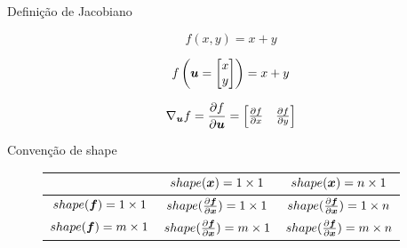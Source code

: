 \documentclass[10pt]{beamer}
\begin{document}
\nocite{DeepLearningbook}
\nocite{VectorCalculus}
\nocite{graphsbackprop}
\nocite{DBLP:journals/corr/abs-1802-01528}

\maketitle

\begin{frame}{Definição de Jacobiano}
\Large{
\begin{equation*}
f(x, y) = x + y
\end{equation*}

\vspace{0.5 cm}

\begin{equation*}
f\left( \bm{u} = \begin{bmatrix}x \\ y\end{bmatrix}\right) = x + y
\end{equation*}


\vspace{0.5 cm}

\begin{equation*}
\nabla_{\bm{u}} {f} = \frac{\partial f}{\partial \bm{u}} = \begin{bmatrix} \frac{\partial f}{\partial x} & \frac{\partial f}{\partial y} \end{bmatrix}
\end{equation*}
}
\end{frame}

\begin{frame}{Convenção de shape}
\large{
\begin{figure}[H]
\begin{center}
\begin{tabular}{|c|c|c|}
\hline
\cellcolor{orange!100}  & \cellcolor{orange!100} $shape(\bm{x}) = 1\times1$ & \cellcolor{orange!100} $shape(\bm{x}) = n\times1$ \\ \hline
 \cellcolor{orange!100} $shape(\bm{f}) = 1\times1$ & $shape(\frac{\partial \bm{f}}{\partial \bm{x}}) = 1\times1$ & $shape(\frac{\partial \bm{f}}{\partial \bm{x}}) = 1\times n$ \\ \hline
\cellcolor{orange!100} $shape(\bm{f}) = m\times1$ & $shape(\frac{\partial \bm{f}}{\partial \bm{x}}) = m\times1$ & $shape(\frac{\partial \bm{f}}{\partial \bm{x}}) = m\times n$ \\ \hline
\end{tabular}
\end{center}
\end{figure}
}
\end{frame}
\end{document}
